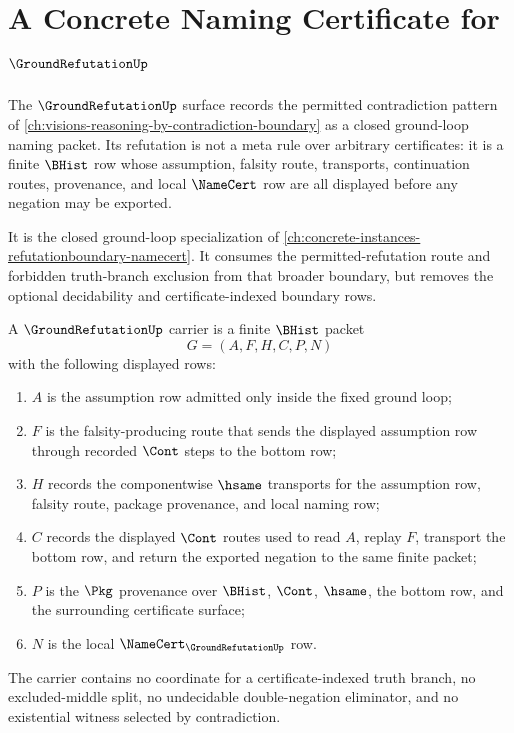 \chapter{A Concrete Naming Certificate for $\GroundRefutationUp$}
\label{ch:concrete-instances-groundrefutation-namecert}

The $\GroundRefutationUp$ surface records the permitted contradiction pattern of \autoref{ch:visions-reasoning-by-contradiction-boundary} as a closed ground-loop naming packet. Its refutation is not a meta rule over arbitrary certificates: it is a finite $\BHist$ row whose assumption, falsity route, transports, continuation routes, provenance, and local $\NameCert$ row are all displayed before any negation may be exported.

It is the closed ground-loop specialization of \autoref{ch:concrete-instances-refutationboundary-namecert}. It consumes the permitted-refutation route and forbidden truth-branch exclusion from that broader boundary, but removes the optional decidability and certificate-indexed boundary rows.

\begin{definition}
\label{def:ground-refutation-carrier}
A $\GroundRefutationUp$ carrier is a finite $\BHist$ packet
$$
G=(A,F,H,C,P,N)
$$
with the following displayed rows:
\begin{enumerate}
\item $A$ is the assumption row admitted only inside the fixed ground loop;
\item $F$ is the falsity-producing route that sends the displayed assumption row through recorded $\Cont$ steps to the bottom row;
\item $H$ records the componentwise $\hsame$ transports for the assumption row, falsity route, package provenance, and local naming row;
\item $C$ records the displayed $\Cont$ routes used to read $A$, replay $F$, transport the bottom row, and return the exported negation to the same finite packet;
\item $P$ is the $\Pkg$ provenance over $\BHist$, $\Cont$, $\hsame$, the bottom row, and the surrounding certificate surface;
\item $N$ is the local $\NameCert_{\GroundRefutationUp}$ row.
\end{enumerate}
The carrier contains no coordinate for a certificate-indexed truth branch, no excluded-middle split, no undecidable double-negation eliminator, and no existential witness selected by contradiction.
\end{definition}

